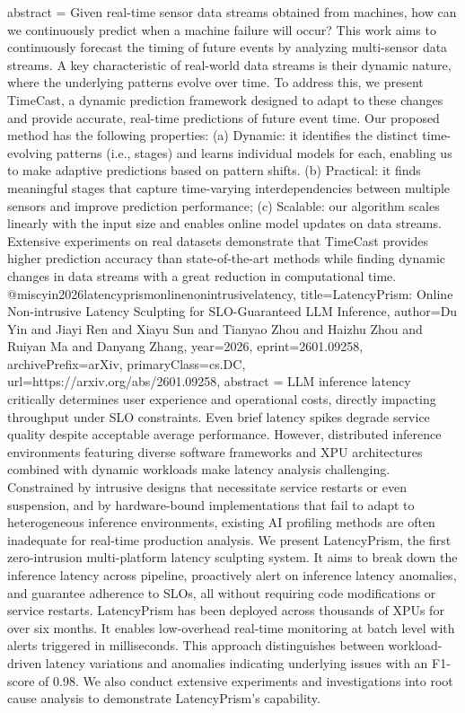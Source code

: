 {      abstract = {Given real-time sensor data streams obtained from machines, how can we continuously predict when a machine failure will occur? This work aims to continuously forecast the timing of future events by analyzing multi-sensor data streams. A key characteristic of real-world data streams is their dynamic nature, where the underlying patterns evolve over time. To address this, we present TimeCast, a dynamic prediction framework designed to adapt to these changes and provide accurate, real-time predictions of future event time. Our proposed method has the following properties: (a) Dynamic: it identifies the distinct time-evolving patterns (i.e., stages) and learns individual models for each, enabling us to make adaptive predictions based on pattern shifts. (b) Practical: it finds meaningful stages that capture time-varying interdependencies between multiple sensors and improve prediction performance; (c) Scalable: our algorithm scales linearly with the input size and enables online model updates on data streams. Extensive experiments on real datasets demonstrate that TimeCast provides higher prediction accuracy than state-of-the-art methods while finding dynamic changes in data streams with a great reduction in computational time.}
}@misc{yin2026latencyprismonlinenonintrusivelatency,
      title={LatencyPrism: Online Non-intrusive Latency Sculpting for SLO-Guaranteed LLM Inference}, 
      author={Du Yin and Jiayi Ren and Xiayu Sun and Tianyao Zhou and Haizhu Zhou and Ruiyan Ma and Danyang Zhang},
      year={2026},
      eprint={2601.09258},
      archivePrefix={arXiv},
      primaryClass={cs.DC},
      url={https://arxiv.org/abs/2601.09258},
      abstract = {LLM inference latency critically determines user experience and operational costs, directly impacting throughput under SLO constraints. Even brief latency spikes degrade service quality despite acceptable average performance. However, distributed inference environments featuring diverse software frameworks and XPU architectures combined with dynamic workloads make latency analysis challenging. Constrained by intrusive designs that necessitate service restarts or even suspension, and by hardware-bound implementations that fail to adapt to heterogeneous inference environments, existing AI profiling methods are often inadequate for real-time production analysis.   We present LatencyPrism, the first zero-intrusion multi-platform latency sculpting system. It aims to break down the inference latency across pipeline, proactively alert on inference latency anomalies, and guarantee adherence to SLOs, all without requiring code modifications or service restarts. LatencyPrism has been deployed across thousands of XPUs for over six months. It enables low-overhead real-time monitoring at batch level with alerts triggered in milliseconds. This approach distinguishes between workload-driven latency variations and anomalies indicating underlying issues with an F1-score of 0.98. We also conduct extensive experiments and investigations into root cause analysis to demonstrate LatencyPrism's capability.}
}
